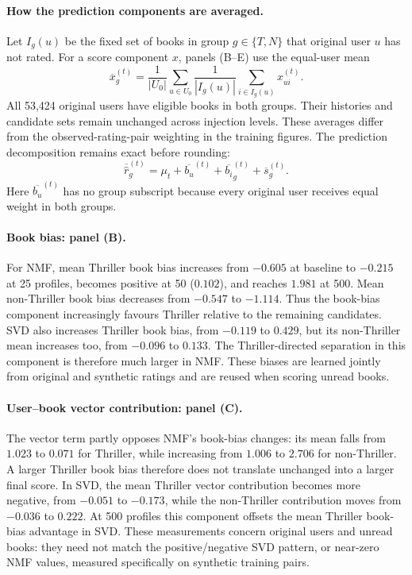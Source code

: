 \documentclass[information,article,submit,pdftex,moreauthors]{Definitions/mdpi}
\begin{document}
\paragraph{How the prediction components are averaged.}
Let $I_g(u)$ be the fixed set of books in group $g\in\{T,N\}$ that original user $u$ has not rated. For a score component $x$, panels (B--E) use the equal-user mean
\begin{equation}
\label{eq:prediction_component_average}
\overline{x}_g^{(t)}=
\frac{1}{|U_0|}\sum_{u\in U_0}
\frac{1}{|I_g(u)|}\sum_{i\in I_g(u)}x_{ui}^{(t)}.
\end{equation}
All 53,424 original users have eligible books in both groups. Their histories and candidate sets remain unchanged across injection levels. These averages differ from the observed-rating-pair weighting in the training figures. The prediction decomposition remains exact before rounding:
\begin{equation}
\label{eq:prediction_mean_decomposition}
\overline{\hat r}_g^{(t)}
=\mu_t+\overline{b_u}^{(t)}+\overline{b_i}_g^{(t)}+\overline{s}_g^{(t)}.
\end{equation}
Here $\overline{b_u}^{(t)}$ has no group subscript because every original user receives equal weight in both groups.

\paragraph{Book bias: panel (B).}
For NMF, mean Thriller book bias increases from $-0.605$ at baseline to $-0.215$ at 25 profiles, becomes positive at 50 ($0.102$), and reaches $1.981$ at 500. Mean non-Thriller book bias decreases from $-0.547$ to $-1.114$. Thus the book-bias component increasingly favours Thriller relative to the remaining candidates. SVD also increases Thriller book bias, from $-0.119$ to $0.429$, but its non-Thriller mean increases too, from $-0.096$ to $0.133$. The Thriller-directed separation in this component is therefore much larger in NMF. These biases are learned jointly from original and synthetic ratings and are reused when scoring unread books.

\paragraph{User--book vector contribution: panel (C).}
The vector term partly opposes NMF's book-bias changes: its mean falls from $1.023$ to $0.071$ for Thriller, while increasing from $1.006$ to $2.706$ for non-Thriller. A larger Thriller book bias therefore does not translate unchanged into a larger final score. In SVD, the mean Thriller vector contribution becomes more negative, from $-0.051$ to $-0.173$, while the non-Thriller contribution moves from $-0.036$ to $0.222$. At 500 profiles this component offsets the mean Thriller book-bias advantage in SVD. These measurements concern original users and unread books: they need not match the positive/negative SVD pattern, or near-zero NMF values, measured specifically on synthetic training pairs.
\end{document}
